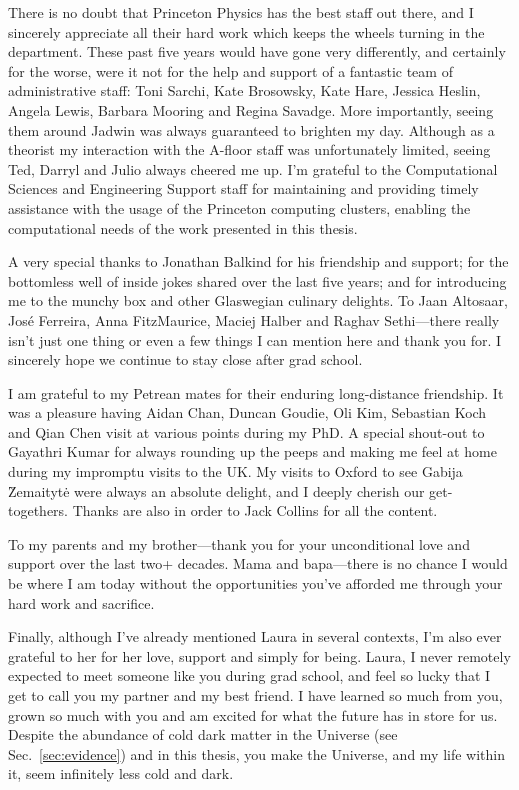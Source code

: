There is no doubt that Princeton Physics has the best staff out there, and I sincerely appreciate all their hard work which keeps the wheels turning in the department. These  past five years would have gone very differently, and certainly for the worse, were it not for the help and support of a fantastic team of administrative staff: Toni Sarchi, Kate Brosowsky, Kate Hare, Jessica Heslin, Angela Lewis, Barbara Mooring and Regina Savadge. More importantly, seeing them around Jadwin was always guaranteed to brighten my day. 
Although as a theorist my interaction with the A-floor staff was unfortunately limited, seeing Ted, Darryl and Julio always cheered me up. I'm grateful to the Computational Sciences and Engineering Support staff for maintaining and providing timely assistance with the usage of the Princeton computing clusters, enabling the computational needs of the work presented in this thesis.

A very special thanks to Jonathan Balkind for his friendship and support; for the bottomless well of inside jokes shared over the last five years; and for introducing me to the munchy box and other Glaswegian culinary delights. To Jaan Altosaar, Jos\'e Ferreira, Anna FitzMaurice, Maciej Halber and Raghav Sethi---there really isn't just one thing or even a few things I can mention here and thank you for. I sincerely hope we continue to stay close after grad school.

I am grateful to my Petrean mates for their enduring long-distance friendship. It was a pleasure having Aidan Chan, Duncan Goudie, Oli Kim, Sebastian Koch and Qian Chen visit at various points during my PhD. A special shout-out to Gayathri Kumar for always rounding up the peeps and making me feel at home during my impromptu visits to the UK. My visits to Oxford to see Gabija \u{Z}emaityt\.{e} were always an absolute delight, and I deeply cherish our get-togethers. Thanks are also in order to Jack Collins for all the content.

To my parents and my brother---thank you for your unconditional love and support over the last two+ decades. Mama and bapa---there is no chance I would be where I am today without the opportunities you've afforded me through your hard work and sacrifice.

Finally, although I've already mentioned Laura in several contexts, I'm also ever grateful to her for her love, support and simply for being. Laura, I never remotely expected to meet someone like you during grad school, and feel so lucky that I get to call you my partner and my best friend. I have learned so much from you, grown so much with you and am excited for what the future has in store for us. Despite the abundance of cold dark matter in the Universe (see Sec.~\ref{sec:evidence}) and in this thesis, you make the Universe, and my life within it, seem infinitely less cold and dark.

\sectionline


